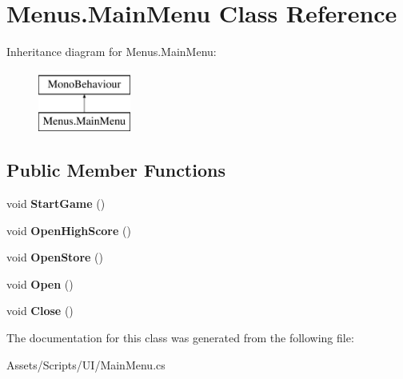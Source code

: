 \hypertarget{class_menus_1_1_main_menu}{}\section{Menus.\+Main\+Menu Class Reference}
\label{class_menus_1_1_main_menu}
Inheritance diagram for Menus.\+Main\+Menu\+:\begin{figure}[H]
\begin{center}
\leavevmode
\includegraphics[height=2.000000cm]{class_menus_1_1_main_menu}
\end{center}
\end{figure}
\subsection*{Public Member Functions}
\begin{DoxyCompactItemize}
\item 
void {\bfseries Start\+Game} ()\hypertarget{class_menus_1_1_main_menu_ac97747732432fa983f5a6cb92642df3b}{}\label{class_menus_1_1_main_menu_ac97747732432fa983f5a6cb92642df3b}

\item 
void {\bfseries Open\+High\+Score} ()\hypertarget{class_menus_1_1_main_menu_aa2927bfce459657e7e199a0db8f11d4b}{}\label{class_menus_1_1_main_menu_aa2927bfce459657e7e199a0db8f11d4b}

\item 
void {\bfseries Open\+Store} ()\hypertarget{class_menus_1_1_main_menu_ae6e4123928bc580afc1469dddd860166}{}\label{class_menus_1_1_main_menu_ae6e4123928bc580afc1469dddd860166}

\item 
void {\bfseries Open} ()\hypertarget{class_menus_1_1_main_menu_a3779e5d70d9a7fb549378d6e14709284}{}\label{class_menus_1_1_main_menu_a3779e5d70d9a7fb549378d6e14709284}

\item 
void {\bfseries Close} ()\hypertarget{class_menus_1_1_main_menu_aea5a4a0bc02f1464a233fed2430d3e32}{}\label{class_menus_1_1_main_menu_aea5a4a0bc02f1464a233fed2430d3e32}

\end{DoxyCompactItemize}


The documentation for this class was generated from the following file\+:\begin{DoxyCompactItemize}
\item 
Assets/\+Scripts/\+U\+I/Main\+Menu.\+cs\end{DoxyCompactItemize}
